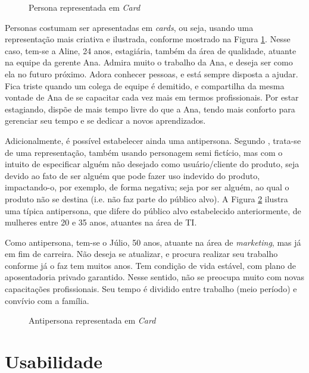 \begin{figure}[h!]
	\centering
	\caption{Persona representada em \textit{Card}}
	\label{fig01}
\end{figure}

Personas costumam ser apresentadas em \textit{cards}, ou seja, usando uma representação mais criativa e ilustrada, conforme mostrado na 
Figura \ref{fig01}. Nesse caso, tem-se a Aline, 24 anos, estagiária, também da área de qualidade, atuante na equipe da gerente Ana. Admira 
muito o trabalho da Ana, e deseja ser como ela no futuro próximo. Adora conhecer pessoas, e está sempre disposta a ajudar. Fica 
triste quando um colega de equipe é demitido, e compartilha da mesma vontade de Ana de se capacitar cada vez mais em termos profissionais. 
Por estar estagiando, dispõe de mais tempo livre do que a Ana, tendo mais conforto para gerenciar seu tempo e se dedicar a novos aprendizados.

Adicionalmente, é possível estabelecer ainda uma antipersona. Segundo , trata-se de uma representação, também usando 
personagem semi fictício, mas com o intuito de especificar alguém não desejado como usuário/cliente do produto, seja devido ao fato de ser 
alguém que pode fazer uso indevido do produto, impactando-o, por exemplo, de forma negativa; seja por ser alguém, ao qual o produto não se 
destina (i.e. não faz parte do público alvo). A Figura \ref{fig02} ilustra uma típica antipersona, que difere do público alvo estabelecido anteriormente, 
de mulheres entre 20 e 35 anos, atuantes na área de TI.

Como antipersona, tem-se o Júlio, 50 anos, atuante na área de \textit{marketing}, mas já em fim de carreira. Não deseja se atualizar, e procura realizar 
seu trabalho conforme já o faz tem muitos anos. Tem condição de vida estável, com plano de aposentadoria privado garantido. Nesse sentido, não se 
preocupa muito com novas capacitações profissionais. Seu tempo é dividido entre trabalho (meio período) e convívio com a família.

\begin{figure}[h!]
	\centering
	\caption{Antipersona representada em \textit{Card}}
	\label{fig02}
\end{figure}

\section{Usabilidade}
\label{sec:Usabilidade}

